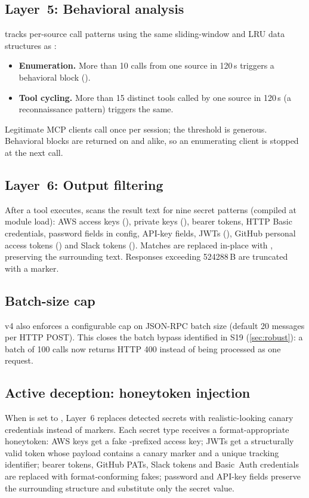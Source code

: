 \documentclass[10pt,twocolumn]{article}
\begin{document}
\subsection{Layer~5: Behavioral analysis}
\bastion{} tracks per-source call patterns using the same sliding-window and
LRU data structures as \sys{}:
\begin{itemize}
\item \textbf{Enumeration.} More than 10  calls from one
      source in 120\,s triggers a behavioral block ().
\item \textbf{Tool cycling.} More than 15 distinct tools called by one
      source in 120\,s (a reconnaissance pattern) triggers the same.
\end{itemize}
Legitimate MCP clients call  once per session; the threshold
is generous. Behavioral blocks are returned on  and
 alike, so an enumerating client is stopped at the next call.

\subsection{Layer~6: Output filtering}
After a tool executes, \bastion{} scans the result text for nine secret
patterns (compiled at module load):
AWS access keys (), private keys
(), bearer tokens, HTTP Basic
credentials, password fields in config, API-key fields, JWTs
(), GitHub personal access tokens () and
Slack tokens (). Matches are replaced in-place with
, preserving the surrounding text. Responses
exceeding \num{524288}\,B are truncated with a \code{[TRUNCATED]} marker.

\subsection{Batch-size cap}
v4 also enforces a configurable cap on JSON-RPC batch size (default 20
messages per HTTP POST). This closes the batch bypass identified in S19
(\cref{sec:robust}): a batch of 100  calls now returns
HTTP 400 instead of being processed as one request.

\subsection{Active deception: honeytoken injection}\label{sec:honeytoken}
When  is set to , Layer~6 replaces
detected secrets with realistic-looking canary credentials instead of
 markers. Each secret type receives a
format-appropriate honeytoken: AWS keys get a fake -prefixed
access key; JWTs get a structurally valid token whose payload contains a
canary marker and a unique tracking identifier; bearer tokens, GitHub PATs,
Slack tokens and Basic~Auth credentials are replaced with format-conforming
fakes; password and API-key fields preserve the surrounding
 structure and substitute only the secret value.
\end{document}
